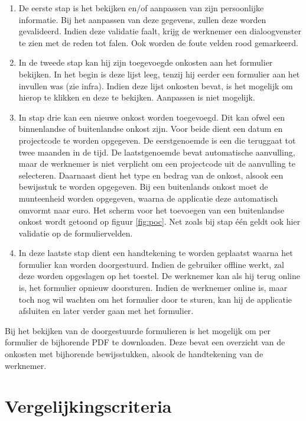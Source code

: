 \begin{enumerate}
\item De eerste stap is het bekijken en/of aanpassen van zijn persoonlijke informatie.
Bij het aanpassen van deze gegevens, zullen deze worden gevalideerd.
Indien deze validatie faalt, krijg de werknemer een dialoogvenster te zien met de reden tot falen.
Ook worden de foute velden rood gemarkeerd.

\item In de tweede stap kan hij zijn toegevoegde onkosten aan het formulier bekijken.
In het begin is deze lijst leeg, tenzij hij eerder een formulier aan het invullen was (zie infra).
Indien deze lijst onkosten bevat, is het mogelijk om hierop te klikken en deze te bekijken. Aanpassen is niet mogelijk.

\item In stap drie kan een nieuwe onkost worden toegevoegd.
Dit kan ofwel een binnenlandse of buitenlandse onkost zijn.
Voor beide dient een datum en projectcode te worden opgegeven.
De eerstgenoemde is een  die teruggaat tot twee maanden in de tijd.
De laatstgenoemde bevat automatische aanvulling, maar de werknemer is niet verplicht om een projectcode uit de aanvulling te selecteren.
Daarnaast dient het type en bedrag van de onkost, alsook een bewijsstuk te worden opgegeven.
Bij een buitenlands onkost moet de munteenheid worden opgegeven, waarna de applicatie deze automatisch omvormt naar euro.
Het scherm voor het toevoegen van een buitenlandse onkost wordt getoond op figuur \ref{fig:poc}. 
Net zoals bij stap één geldt ook hier validatie op de formuliervelden.

\item In deze laatste stap dient een handtekening te worden geplaatst waarna het formulier kan worden doorgestuurd.
Indien de gebruiker offline werkt, zal deze worden opgeslagen op het toestel.
De werknemer kan als hij terug online is, het formulier opnieuw doorsturen.
Indien de werknemer online is, maar toch nog wil wachten om het formulier door te sturen, kan hij de applicatie afsluiten en later verder gaan met het formulier.

\end{enumerate}

Bij het bekijken van de doorgestuurde formulieren is het mogelijk om per formulier de bijhorende PDF te downloaden. 
Deze bevat een overzicht van de onkosten met bijhorende bewijsstukken, alsook de handtekening van de werknemer.

\section{Vergelijkingscriteria}
\label{sec:vergelijking-criteria}


